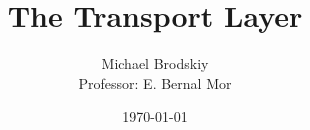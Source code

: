 


\title{The Transport Layer}
\date{\today}
\author{Michael Brodskiy\\ \small Professor: E. Bernal Mor}



\maketitle

